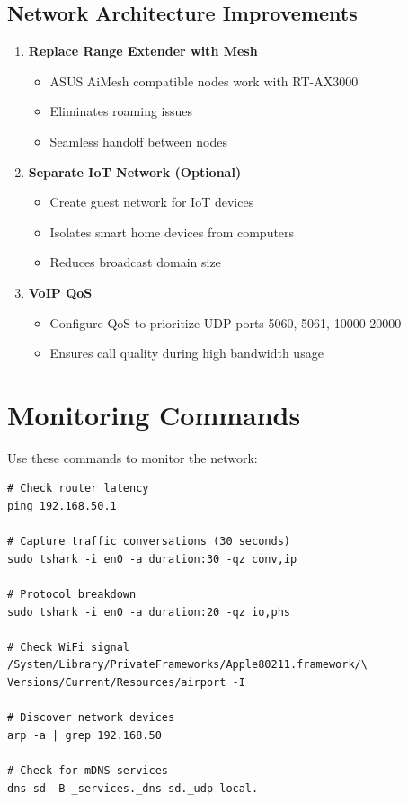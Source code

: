\documentclass[11pt,letterpaper]{article}
\begin{document}
\subsection{Network Architecture Improvements}

\begin{enumerate}
    \item \textbf{Replace Range Extender with Mesh}
    \begin{itemize}
        \item ASUS AiMesh compatible nodes work with RT-AX3000
        \item Eliminates roaming issues
        \item Seamless handoff between nodes
    \end{itemize}

    \item \textbf{Separate IoT Network (Optional)}
    \begin{itemize}
        \item Create guest network for IoT devices
        \item Isolates smart home devices from computers
        \item Reduces broadcast domain size
    \end{itemize}

    \item \textbf{VoIP QoS}
    \begin{itemize}
        \item Configure QoS to prioritize UDP ports 5060, 5061, 10000-20000
        \item Ensures call quality during high bandwidth usage
    \end{itemize}
\end{enumerate}

\section{Monitoring Commands}

Use these commands to monitor the network:

\begin{verbatim}
# Check router latency
ping 192.168.50.1

# Capture traffic conversations (30 seconds)
sudo tshark -i en0 -a duration:30 -qz conv,ip

# Protocol breakdown
sudo tshark -i en0 -a duration:20 -qz io,phs

# Check WiFi signal
/System/Library/PrivateFrameworks/Apple80211.framework/\
Versions/Current/Resources/airport -I

# Discover network devices
arp -a | grep 192.168.50

# Check for mDNS services
dns-sd -B _services._dns-sd._udp local.
\end{verbatim}
\end{document}
